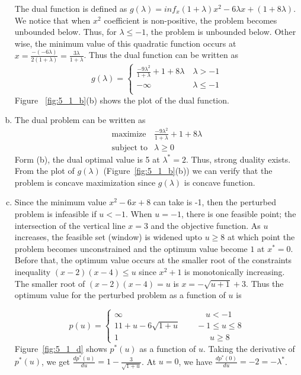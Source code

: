 \documentclass[12pt] {article}
\begin{document}
\begin{enumerate}[(a)]
The dual function is defined as $g(\lambda) = inf_{x} (1+\lambda)x^{2} - 6\lambda x + (1+8\lambda)$. We notice that when $x^{2}$ coefficient is non-positive, the problem becomes unbounded below. Thus, for $\lambda \leq -1$, the problem is unbounded below. Other wise, the minimum value of this quadratic function occurs at $x = \frac{-(-6\lambda)}{2(1+\lambda)} = \frac{3\lambda}{1+\lambda}$. Thus the dual function can be written as 
$$
g(\lambda)=
\begin{cases}
   \frac{-9\lambda^{2}}{1+\lambda}+1+8\lambda \quad \lambda > -1 \\    
   -\infty            \quad \quad \quad \quad \quad \lambda \leq -1 \\    
\end{cases}
$$
Figure ~\ref{fig:5_1_b}(b) shows the plot of the dual function. 
\item The dual problem can be written as 
\[
\begin{array}{cl}
\text{maximize} & \frac{-9\lambda^{2}}{1+\lambda}+1+8\lambda\\
\text{subject to} & \lambda \geq 0
\end{array} 
\]
Form (b), the dual optimal value is 5 at $\lambda^{*} =2$. Thus, strong duality exists. From the plot of $g(\lambda)$ (Figure~\ref{fig:5_1_b}(b)) we can verify that the problem is concave maximization since $g(\lambda)$ is concave function. 

\item Since the minimum value $x^{2}-6x +8$ can take is -1, then the perturbed problem is infeasible if $u<-1$. When $u=-1$, there is one feasible point; the intersection of the vertical line $x=3$ and the objective function. As $u$ increases, the feasible set (window) is widened upto $u\geq 8$ at which point the problem becomes unconstrained and the optimum value become $1$ at $x^{*}=0$. Before that, the optimum value occurs at the smaller root of the constraints inequality $(x-2)(x-4)\leq u$ since $x^{2}+1$ is monotonically increasing. The smaller root of $(x-2)(x-4)=u$  is $x=-\sqrt{u +1}+3$. Thus the optimum value for the perturbed problem as a function of $u$ is 

$$
p(u)=
\begin{cases}
	\infty \qquad \qquad \qquad \qquad \qquad u< -1 \\
	11 + u - 6\sqrt{1+u} \qquad -1\leq u \leq 8 \\
	1 \qquad \qquad \qquad \qquad \qquad \quad u\geq 8
\end{cases}
$$
Figure~\ref{fig:5_1_d} shows $p^{*}(u)$ as a function of $u$. Taking the derivative of $p^{*}(u)$, we get $\frac{dp^{*}(u)}{du} = 1 - \frac{3}{\sqrt{1+u}}$. At $u=0$, we have $\frac{dp^{*}(0)}{du} = -2 = -\lambda^{*}$.


\end{enumerate}
\end{document}
